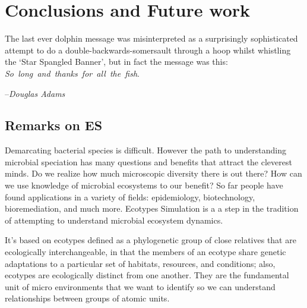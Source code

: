 \gobbletocpage
\chapter{Conclusions and Future work}
\restoretocpage

\begin{shadequote}
The last ever dolphin message was misinterpreted as a surprisingly sophisticated attempt to do a double-backwards-somersault through a hoop whilst whistling the `Star Spangled Banner', but in fact the message was this: \mbox{\emph{So long and thanks for all the fish}}. \par--\emph{Douglas Adams}
\end{shadequote}


\section{Remarks on ES}
Demarcating bacterial species is difficult.
However the path to understanding microbial speciation has many questions and benefits that attract the cleverest minds.
Do we realize how much microscopic diversity there is out there?
How can we use knowledge of microbial ecosystems to our benefit?
So far people have found applications in a variety of fields: epidemiology, biotechnology, bioremediation, and much more.
Ecotypes Simulation is a a step in the tradition of attempting to understand microbial ecosystem dynamics.

It's based on ecotypes defined as a phylogenetic group of close relatives that are ecologically interchangeable, in that the members of an ecotype share genetic adaptations to a particular set of habitats, resources, and conditions; also, ecotypes are ecologically distinct from one another.
They are the fundamental unit of micro environments that we want to identify so we can understand relationships between groups of atomic units.

